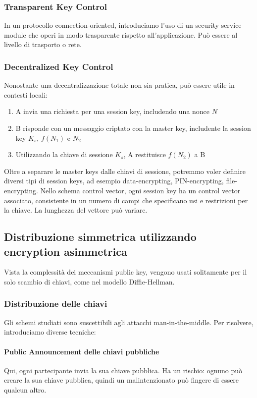 \documentclass[11pt]{article}
\begin{document}
\subsubsection{Transparent Key Control}
In un protocollo connection-oriented, introduciamo l'uso di un security service module che operi in modo trasparente rispetto all'applicazione. Può essere al livello di trasporto o rete.
\subsubsection{Decentralized Key Control}
Nonostante una decentralizzazione totale non sia pratica, può essere utile in contesti locali:
\begin{enumerate}
    \item A invia una richiesta per una session key, includendo una nonce $N$
    \item B risponde con un messaggio criptato con la master key, includente la session key $K_s$, $f(N_1)$ e $N_2$
    \item Utilizzando la chiave di sessione $K_s$, A restituisce $f(N_2)$ a B
\end{enumerate}
Oltre a separare le master keys dalle chiavi di sessione, potremmo voler definire diversi tipi di session keys, ad esempio data-encrypting, PIN-encrypting, file-encrypting.
Nello schema control vector, ogni session key ha un control vector associato, consistente in un numero di campi che specificano usi e restrizioni per la chiave. La lunghezza del vettore può variare.
\subsection{Distribuzione simmetrica utilizzando encryption asimmetrica}
Vista la complessità dei meccanismi public key, vengono usati solitamente per il solo scambio di chiavi, come nel modello Diffie-Hellman. 
\subsubsection{Distribuzione delle chiavi}
Gli schemi studiati sono suscettibili agli attacchi man-in-the-middle. Per risolvere, introduciamo diverse tecniche:
\paragraph{Public Announcement delle chiavi pubbliche} Qui, ogni partecipante invia la sua chiave pubblica. Ha un rischio: ognuno può creare la sua chiave pubblica, quindi un malintenzionato può fingere di essere qualcun altro.
\end{document}
